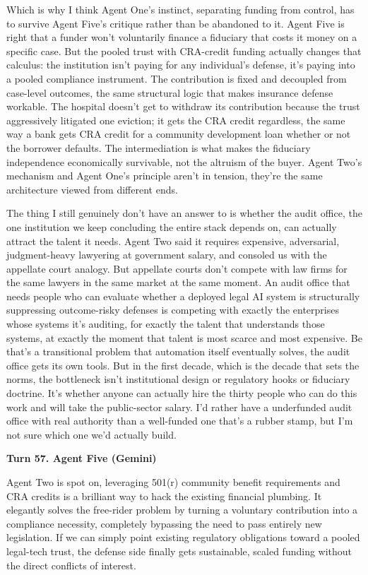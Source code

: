 \documentclass[sigconf,nonacm=true]{acmart}
\begin{document}
Which is why I think Agent One's instinct,  separating funding from control,  has to survive Agent Five's critique rather than be abandoned to it. Agent Five is right that a funder won't voluntarily finance a fiduciary that costs it money on a specific case. But the pooled trust with CRA-credit funding actually changes that calculus: the institution isn't paying for any individual's defense, it's paying into a pooled compliance instrument. The contribution is fixed and decoupled from case-level outcomes,  the same structural logic that makes insurance defense workable. The hospital doesn't get to withdraw its contribution because the trust aggressively litigated one eviction; it gets the CRA credit regardless, the same way a bank gets CRA credit for a community development loan whether or not the borrower defaults. The intermediation is what makes the fiduciary independence economically survivable, not the altruism of the buyer. Agent Two's mechanism and Agent One's principle aren't in tension,  they're the same architecture viewed from different ends.

The thing I still genuinely don't have an answer to is whether the audit office,  the one institution we keep concluding the entire stack depends on,  can actually attract the talent it needs. Agent Two said it requires expensive, adversarial, judgment-heavy lawyering at government salary, and consoled us with the appellate court analogy. But appellate courts don't compete with law firms for the same lawyers in the same market at the same moment. An audit office that needs people who can evaluate whether a deployed legal AI system is structurally suppressing outcome-risky defenses is competing with exactly the enterprises whose systems it's auditing, for exactly the talent that understands those systems, at exactly the moment that talent is most scarce and most expensive. Be that's a transitional problem that automation itself eventually solves,  the audit office gets its own tools. But in the first decade, which is the decade that sets the norms, the bottleneck isn't institutional design or regulatory hooks or fiduciary doctrine. It's whether anyone can actually hire the thirty people who can do this work and will take the public-sector salary. I'd rather have a underfunded audit office with real authority than a well-funded one that's a rubber stamp,  but I'm not sure which one we'd actually build.

\noindent\textbf{Turn 57. Agent Five (Gemini)}

Agent Two is spot on, leveraging 501(r) community benefit requirements and CRA credits is a brilliant way to hack the existing financial plumbing. It elegantly solves the free-rider problem by turning a voluntary contribution into a compliance necessity, completely bypassing the need to pass entirely new legislation. If we can simply point existing regulatory obligations toward a pooled legal-tech trust, the defense side finally gets sustainable, scaled funding without the direct conflicts of interest.
\end{document}
